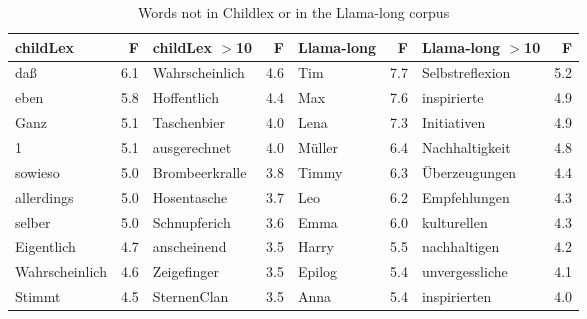 \documentclass[manuscript]{stjour}
\begin{document}
\begin{table}[!htbp]
\caption{Words not in Childlex or in the Llama-long corpus}
\centering
\begin{tabular}{lrlrlrlr}
  \hline
childLex & F & childLex $>$10 & F & Llama-long & F & Llama-long $>$10 & F \\ 
  \hline
daß & 6.1 & Wahrscheinlich & 4.6 & Tim & 7.7 & Selbstreflexion & 5.2 \\ 
  eben & 5.8 & Hoffentlich & 4.4 & Max & 7.6 & inspirierte & 4.9 \\ 
  Ganz & 5.1 & Taschenbier & 4.0 & Lena & 7.3 & Initiativen & 4.9 \\ 
  1 & 5.1 & ausgerechnet & 4.0 & Müller & 6.4 & Nachhaltigkeit & 4.8 \\ 
  sowieso & 5.0 & Brombeerkralle & 3.8 & Timmy & 6.3 & Überzeugungen & 4.4 \\ 
  allerdings & 5.0 & Hosentasche & 3.7 & Leo & 6.2 & Empfehlungen & 4.3 \\ 
  selber & 5.0 & Schnupferich & 3.6 & Emma & 6.0 & kulturellen & 4.3 \\ 
  Eigentlich & 4.7 & anscheinend & 3.5 & Harry & 5.5 & nachhaltigen & 4.2 \\ 
  Wahrscheinlich & 4.6 & Zeigefinger & 3.5 & Epilog & 5.4 & unvergessliche & 4.1 \\ 
  Stimmt & 4.5 & SternenClan & 3.5 & Anna & 5.4 & inspirierten & 4.0 \\ 
   \hline
\end{tabular}
\label{words-lllo}
\end{table}
\end{document}
